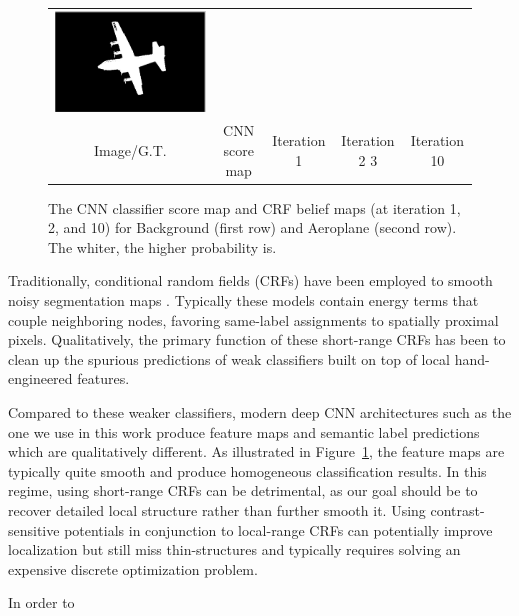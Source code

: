\begin{figure}[ht]
\begin{tabular}{c c c c c}
    \includegraphics[width=0.15\linewidth]{fig/mean_field_illustration/Belief_Class1_Itr10.pdf} \\
    Image/G.T. & CNN score map & Iteration 1 & Iteration 2 3 & Iteration 10 \\
  \end{tabular}
  \caption{The CNN classifier score map and CRF belief maps (at iteration 1, 2, and 10) for Background (first row) and Aeroplane (second row). The whiter, the higher probability is.
    }
  \label{fig:score-maps}
\end{figure}

Traditionally, conditional random fields (CRFs) have been employed to smooth
noisy segmentation maps \cite{rother2004grabcut, kohli2009robust}. Typically
these models contain energy terms that couple neighboring nodes, favoring
same-label assignments to spatially proximal pixels. Qualitatively, the
primary function of these short-range CRFs has been to clean up the spurious
predictions of weak classifiers built on top of local hand-engineered features.

Compared to these weaker classifiers, modern deep CNN architectures such as
the one we use in this work produce feature maps and semantic label
predictions which are qualitatively different. As illustrated in
Figure~\ref{fig:score-maps}, the feature maps are typically quite smooth and
produce homogeneous classification results. In this regime, using short-range
CRFs can be detrimental, as our goal should be to recover detailed local
structure rather than further smooth it. Using contrast-sensitive potentials
\cite{rother2004grabcut} in conjunction to local-range CRFs can potentially
improve localization but still miss thin-structures and typically requires
solving an expensive discrete optimization problem.

In order to 

